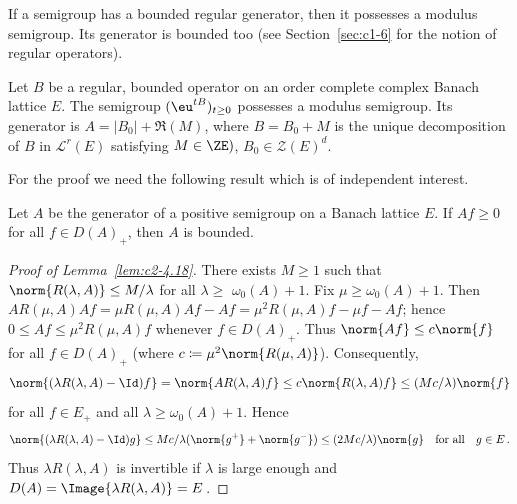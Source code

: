 If a semigroup has a bounded regular generator, then it possesses a modulus semigroup. Its generator is bounded too (see Section~\ref{sec:c1-6} for the notion of regular operators).

\begin{theorem}\label{thm:c2-4.17}
Let $B$ be a regular, bounded operator on an order complete complex Banach lattice $E$. The semigroup $(\eu^{tB})_{t \geq 0}$ possesses a modulus semigroup. Its generator is $A = |B_{0}| + \Re(M)$, where $B = B_{0} + M$ is the unique decomposition of\/ $B$ in $\mathcal{L}^{r}(E)$ satisfying $M \in \ZE)$, $B_{0} \in \mathcal{Z}(E)^{d}$.
\end{theorem}

For the proof we need the following result which is of independent interest.

\begin{lemma}\label{lem:c2-4.18}
Let $A$ be the generator of a positive semigroup on a Banach lattice $E$. 
If\/ $Af \geq 0$ for all $f \in D(A)_{+}$, then $A$ is bounded.
\end{lemma}
\begin{proof}[Proof of Lemma~\ref{lem:c2-4.18}]
There exists $M \geq 1$ such that $\norm{R(\lambda,A)} \leq M/\lambda$ for all $\lambda \geq$ $\omega_{0}(A)+1$.
Fix $\mu \geq \omega_{0}(A)+1$.
Then $AR(\mu,A)Af = \mu R(\mu,A)Af - Af = \mu^{2}R(\mu,A)f - \mu f - Af$; hence $0 \leq Af \leq \mu^{2}R(\mu,A)f$ whenever $f \in D(A)_{+}$.
Thus $\norm{Af} \leq c\norm{f}$ for all $f \in D(A)_{+}$ (where $c \coloneq \mu^{2}\norm{R(\mu,A)}$).
Consequently,
\[
\norm{(\lambda R(\lambda,A) - \Id)f} = \norm{AR(\lambda,A)f} \leq c\norm{R(\lambda,A)f} \leq (Mc/\lambda)\norm{f} 
\]
for all $f \in E_{+}$ and all $ \lambda \geq \omega_{0}(A)+1$. 
Hence
\[
\norm{(\lambda R(\lambda,A) - \Id)g} \leq Mc/\lambda(\norm{g^{+}} + \norm{g^{-}}) \leq (2Mc/\lambda)\norm{g} \quad \text{for all} \quad g \in E\,.
\]
Thus $\lambda R(\lambda,A)$ is invertible if\/ $\lambda$ is large enough and
$D(A) = \Image{\lambda R(\lambda,A)} = E$\,.
\end{proof}
